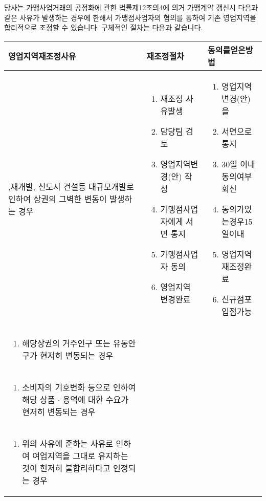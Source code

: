 \documentclass[a5paper,10pt]{oblivoir}
\begin{document}
\begin{enumerate}
\begin{enumerate}
 당사는 가맹사업거래의 공정화에 관한 법률제12조의4에  의거 가맹계약 갱신시 다음과 같은 사유가 발생하는 경우에 한해서 가맹점사업자의 협의를 통하여 기존 영업지역을 합리적으로 조정할 수 있습니다. 구체적인 절차는 다음과 같습니다.

\begin{center}
\begin{tiny}
\begin{tabu}{|X[c]|X[c]|X[c]|}\hline
 영업지역재조정사유&재조정절차& 동의를얻은방법\\\hline
\begin{enumerate}
,재개발, 신도시 건설등 대규모개발로 인하여 상권의 그벽한 변동이 발생하는 경우
\end{enumerate}
& 
\begin{enumerate}
\item 재조정 사유발생
\item 담당팀 검토
\item 영업지역변경(안) 작성
\item 가맹점사업자에게 서면 통지
\item 가맹점사업자 동의
\item  영업지역 변경완료
\end{enumerate}
&
\begin{enumerate}
\item 영업지역변경(안) 을 
\item 서면으로 통지
\item 30일 이내 동의여부회신
\item 동의가있는경우15 일이내
\item 영업지역 재조정완료
\item 신규점포입점가능
\end{enumerate}
\\
\begin{enumerate}
\item 해당상권의 거주인구 또는 유동안구가 현저히 변동되는 경우
\end{enumerate}
&&\\
\begin{enumerate}
\item 소비자의 기호변화 등으로 인하여 해당 상품 $\cdot$ 용역에 대한 수요가 현저히 변동되는 경우
\end{enumerate}
&&\\
\begin{enumerate}
\item 위의 사유에 준하는 사유로 인하여 여업지역을 그대로 유지하는 것이 현저히 불합리하다고 인정되는 경우
\end{enumerate}
&&\\\hline
\end{tabu}
\end{tiny}
\end{center}
\end{enumerate}


\end{enumerate}
\end{document}
